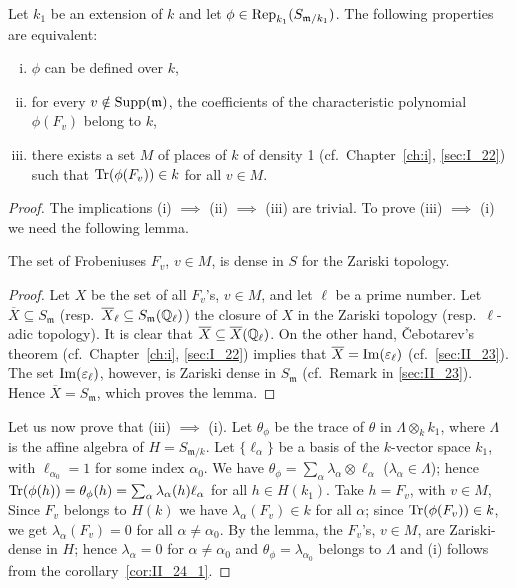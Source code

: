 \begin{enumerate}[a), wide]
\begin{prop}\label{prop:II_24_2}
Let $k_1$ be an extension of $k$ and let $\phi \in
\operatorname{Rep}_{k_1}(S_{\mathfrak{m} /k_1})$. The following properties are equivalent:
\begin{enumerate}[(i)]
\item $\phi$ can be defined over $k$,
\item for every $v \notin \operatorname{Supp}(\mathfrak{m})$, the coefficients of the
	characteristic polynomial $\phi(F_v)$ belong to $k$,
\item there exists a set $M$ of places of $k$ of density 1 (cf.\ 
	Chapter~\ref{ch:i}, \ref{sec:I_22}) such that $\operatorname{Tr}(\phi(F_v)) \in k$
	for all $v \in M$.
\end{enumerate}
\end{prop}
\begin{proof}
The implications (i) $\implies$ (ii) $\implies$ (iii) are trivial.
To prove (iii) $\implies$ (i) we need the following lemma.

\begin{lem}
	The set of Frobeniuses $F_v$, $v \in M$, is dense in $S$ for
	the Zariski topology.
\end{lem}
\begin{proof}
Let $X$ be the set of all $F_v$'s, $v \in M$, and let $\ell$ be a prime number.
Let $\overline{X} \subseteq S_{\mathfrak{m}}$ (resp.\ $\overline{X}_\ell
\subseteq S_{\mathfrak{m}}(\mathbb{Q}_\ell)$) the closure of $X$ in the Zariski
topology (resp.\ $\ell$-adic topology). It is clear that
\dpage
$\overline{X} \subseteq \overline{X}(\mathbb{Q}_\ell)$. On the other hand, \v
Cebotarev's theorem (cf.\ Chapter~\ref{ch:i}, \ref{sec:I_22}) implies that
$\overline{X} = \operatorname{Im}(\varepsilon_\ell)$ (cf.\ \ref{sec:II_23}). The set
$\operatorname{Im}(\varepsilon_\ell)$, however, is Zariski dense in $S_{\mathfrak{m}}$ (cf.\ 
Remark in \ref{sec:II_23}). Hence $\overline{X} = S_{\mathfrak{m}}$, which
proves the lemma.
\end{proof}

Let us now prove that (iii) $\implies$ (i). Let $\theta_\phi$ be the trace
of $\theta$ in $\Lambda \otimes_k k_1$, where $\Lambda$ is the affine algebra
of $H = S_{\mathfrak{m} /k}$. Let $\{ \ell_\alpha \}$ be a basis of the
$k$-vector space $k_1$, with $\ell_{\alpha_0} = 1$ for some index $\alpha_0$.
We have $\theta_\phi = \sum_{\alpha} \lambda_\alpha \otimes \ell_\alpha$
($\lambda_\alpha \in \Lambda$); hence $\operatorname{Tr}( \phi(h) ) = \theta_\phi(h) =
\sum_{\alpha} \lambda_\alpha(h) \ell_\alpha$ for all $h \in H(k_1)$. Take $h =
F_v$, with $v \in M$, Since $F_v$ belongs to $H(k)$ we have
$\lambda_\alpha(F_v) \in k$ for all $\alpha$; since $\operatorname{Tr}(\phi(F_v)) \in k$,
we get $\lambda_\alpha(F_v) = 0$ for all $\alpha \ne \alpha_0$. By the lemma,
the $F_v$'s, $v \in M$, are Zariski-dense in $H$; hence $\lambda_\alpha = 0$
for $\alpha \ne \alpha_0$ and $\theta_\phi = \lambda_{\alpha_0}$ belongs to
$\Lambda$ and (i) follows from the corollary~\ref{cor:II_24_1}.
\end{proof}
\end{enumerate}

